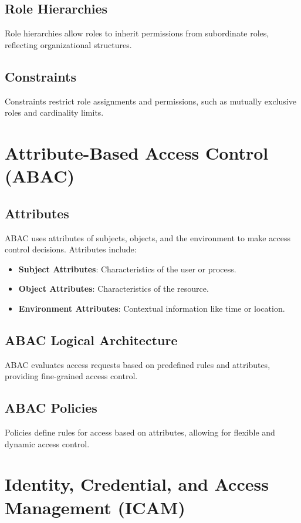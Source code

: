 \documentclass{article}
\begin{document}
\subsection{Role Hierarchies}
Role hierarchies allow roles to inherit permissions from subordinate roles, reflecting organizational structures.

\subsection{Constraints}
Constraints restrict role assignments and permissions, such as mutually exclusive roles and cardinality limits.

\section{Attribute-Based Access Control (ABAC)}
\subsection{Attributes}
ABAC uses attributes of subjects, objects, and the environment to make access control decisions. Attributes include:
\begin{itemize}
    \item \textbf{Subject Attributes}: Characteristics of the user or process.
    \item \textbf{Object Attributes}: Characteristics of the resource.
    \item \textbf{Environment Attributes}: Contextual information like time or location.
\end{itemize}

\subsection{ABAC Logical Architecture}
ABAC evaluates access requests based on predefined rules and attributes, providing fine-grained access control.

\subsection{ABAC Policies}
Policies define rules for access based on attributes, allowing for flexible and dynamic access control.

\section{Identity, Credential, and Access Management (ICAM)}
\end{document}
